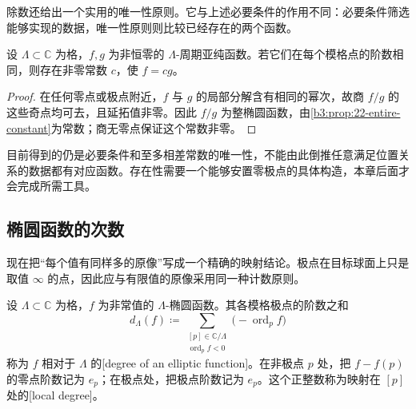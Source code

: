 \ProseParagraphBreak
除数还给出一个实用的唯一性原则。它与上述必要条件的作用不同：必要条件筛选能够实现的数据，唯一性原则则比较已经存在的两个函数。

\begin{corollary}\label{b3:cor:22-divisor-uniqueness}
设 \(\Lambda\subset\mathbb C\) 为格，\(f,g\) 为非恒零的 \(\Lambda\)-周期亚纯函数。若它们在每个模格点的阶数相同，则存在非零常数 \(c\)，使 \(f=cg\)。
\end{corollary}
\begin{proof}
在任何零点或极点附近，\(f\) 与 \(g\) 的局部分解含有相同的幂次，故商 \(f/g\) 的这些奇点均可去，且延拓值非零。因此 \(f/g\) 为整椭圆函数，由\cref{b3:prop:22-entire-constant}为常数；商无零点保证这个常数非零。
\end{proof}

目前得到的仍是必要条件和至多相差常数的唯一性，不能由此倒推任意满足位置关系的数据都有对应函数。存在性需要一个能够安置零极点的具体构造，本章后面才会完成所需工具。

\subsection{椭圆函数的次数}
\label{b3:subsec:220204}

现在把“每个值有同样多的原像”写成一个精确的映射结论。极点在目标球面上只是取值 \(\infty\) 的点，因此应与有限值的原像采用同一种计数原则。

\begin{definition}\label{b3:def:22-degree}
设 \(\Lambda\subset\mathbb C\) 为格，\(f\) 为非常值的 \(\Lambda\)-椭圆函数。其各模格极点的阶数之和
\[
 d_\Lambda(f)\coloneqq
 \sum_{\substack{[p]\in\mathbb C/\Lambda\\\operatorname{ord}_p f<0}}
 \bigl(-\operatorname{ord}_p f\bigr)
\]
称为 \(f\) 相对于 \(\Lambda\) 的[degree of an elliptic function]。在非极点 \(p\) 处，把 \(f-f(p)\) 的零点阶数记为 \(e_p\)；在极点处，把极点阶数记为 \(e_p\)。这个正整数称为映射在 \([p]\) 处的[local degree]。
\end{definition}

